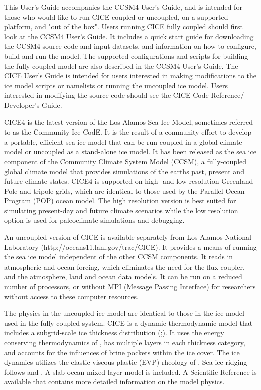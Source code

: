 
This User's Guide accompanies the CCSM4 User's Guide, and is intended
for those who would like to run CICE coupled or uncoupled, on a supported
platform, and "out of the box".  Users running CICE fully coupled should first
look at the CCSM4 User's Guide.  It includes a quick start guide for downloading
the CCSM4 source code and input datasets, and information on how to configure,
build and run the model.  The supported configurations and scripts for building
the fully coupled model are also described in the CCSM4 User's Guide.  The CICE
User's Guide is intended for users interested in making modifications to the
ice model scripts or namelists or running the uncoupled ice model.  Users
interested in modifying the source code should see the CICE Code Reference/
Developer's Guide.

CICE4 is the latest version of the Los Alamos Sea Ice Model, sometimes
referred to as the Community Ice CodE.  It is the
result of a community effort to develop a portable, efficient sea ice model
that can be run coupled in a global climate model or uncoupled as a stand-alone
ice model. It has been released as the sea ice component of the Community
Climate System Model (CCSM), a fully-coupled global climate model that
provides simulations of the earths past, present and future climate states.
CICE4 is supported on high- and low-resolution Greenland Pole
and tripole grids, which are identical to those used by the Parallel Ocean 
Program (POP)
ocean model.  The high resolution version is best suited for simulating 
present-day and future climate scenarios while the low resolution option is
used for paleoclimate simulations and debugging.

An uncoupled version of CICE is available separately from Los Alamos National
Laboratory (http://oceans11.lanl.gov/trac/CICE).  It provides a means of running
the sea ice model independent of the other CCSM components.  It reads in
atmospheric and ocean forcing, which eliminates the need for the flux coupler,
and the atmosphere, land and ocean data models.  It can be run on a reduced
number of processors, or without MPI (Message Passing Interface) for researchers
without access to these computer resources.

The physics in the uncoupled ice model are identical to those in the
ice model used in the fully coupled system.  CICE is a dynamic-thermodynamic
model that includes a subgrid-scale ice thickness distribution
(\cite{bitz01};\cite{lips01}).  It uses the energy conserving thermodynamics
of \cite{bitz99}, has multiple layers in each thickness category, and accounts
for the influences of brine pockets within the ice cover.  The ice dynamics
utilizes the elastic-viscous-plastic (EVP) rheology of \cite{hunk97}.  Sea ice
ridging follows \cite{roth75b} and \cite{thor75}.  A slab ocean mixed layer model
is included.  A Scientific Reference is available that contains more detailed
information on the model physics. 

